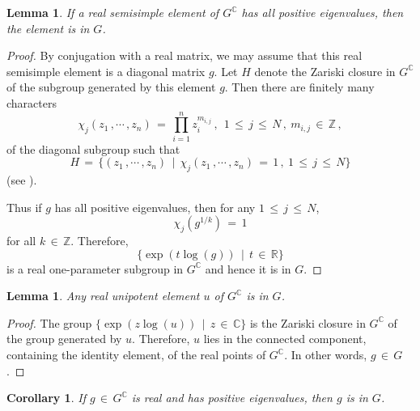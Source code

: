 \documentclass[12pt]{amsart}
\newtheorem{lemma}[theorem]{Lemma}
\newtheorem{corollary}[theorem]{Corollary}
\begin{document}
\begin{lemma}
\label{lem1} If a real semisimple element of $G^{\mathbb{C}}$ has all
positive eigenvalues, then the element is in $G$.
\end{lemma}

\begin{proof}
By conjugation with a real matrix, we may assume that this real semisimple
element is a diagonal matrix $g$. Let $H$ denote the Zariski closure in
$G^{\mathbb{C}}$ of the subgroup generated by this element $g$. Then there are
finitely many characters
\begin{equation*}
\chi_j (z_1\, ,\cdots\, ,z_n)\,=\, \prod_{i=1}^n z^{m_{i,j}}_i\, ,~\
1\,\leq\, j\, \leq\, N\, , \ m_{i,j}\, \in\, {\mathbb{Z}}\, ,
\end{equation*}
of the diagonal subgroup such that
\begin{equation*}
H\, =\, \{(z_1\, ,\cdots\, ,z_n)\,\mid\, \chi_j (z_1\, ,\cdots\, ,z_n)\,=\,
1\, , \ 1\,\leq\, j\, \leq\, N\}
\end{equation*}
(see \cite[p. 17, Proposition]{Bo}).

Thus if $g$ has all positive eigenvalues, then for any $1\,\leq\, j\, \leq\,
N$,
\begin{equation*}
\chi_j(g^{1/k})\,=\, 1
\end{equation*}
for all $k\, \in\, {\mathbb{Z}}$. Therefore,
\begin{equation*}
\{\exp(t\log (g))\,\mid\, t\,\in\, {\mathbb{R}}\}
\end{equation*}
is a real one-parameter subgroup in $G^{\mathbb{C}}$ and hence it is in $G$.
\end{proof}

\begin{lemma}
\label{lem2} Any real unipotent element $u$ of $G^{\mathbb{C}}$ is in $G$.
\end{lemma}

\begin{proof}
The group $\{\exp(z\log (u))\,\mid\, z\,\in\, {\mathbb{C}}\}$ is the Zariski
closure in $G^{\mathbb{C}}$ of the group generated by $u$. Therefore, $u$
lies in the connected component, containing the identity element, of the
real points of $G^{\mathbb{C}}$. In other words, $g\, \in\, G$.
\end{proof}

\begin{corollary}
\label{cor1} If $g\, \in\, G^{\mathbb{C}}$ is real and has positive
eigenvalues, then $g$ is in $G$.
\end{corollary}
\end{document}
